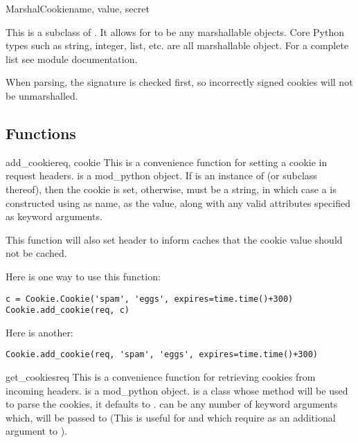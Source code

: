 \begin{classdesc}{MarshalCookie}{name, value, secret}

  This is a subclass of . It allows for
   to be any marshallable objects. Core Python types such as
  string, integer, list, etc. are all marshallable object. For a
  complete list see
  module documentation.

  When parsing, the signature is checked first, so incorrectly signed cookies
  will not be unmarshalled.

\end{classdesc}

\subsection{Functions\label{pyapi-cookie-func}}

\begin{funcdesc}{add_cookie}{req, cookie}
  This is a convenience function for setting a cookie in request
  headers.  is a mod_python  object.  If
   is an instance of  (or subclass thereof),
  then the cookie is set, otherwise,  must be a string, in
  which case a  is constructed using  as
  name,  as the value, along with any valid 
  attributes specified as keyword arguments.

  This function will also set  header to inform caches that the cookie value
  should not be cached.

  Here is one way to use this function:
  \begin{verbatim}
c = Cookie.Cookie('spam', 'eggs', expires=time.time()+300)
Cookie.add_cookie(req, c)
  \end{verbatim}
  Here is another:
  \begin{verbatim}
Cookie.add_cookie(req, 'spam', 'eggs', expires=time.time()+300)
  \end{verbatim}
\end{funcdesc}

\begin{funcdesc}{get_cookies}{req }
  This is a convenience function for retrieving cookies from incoming
  headers.  is a mod_python 
  object.  is a class whose  method will be
  used to parse the cookies, it defaults to . 
  can be any number of keyword arguments which, will be passed to
   (This is useful for  and
   which require  as an additional
  argument to ).
\end{funcdesc}

